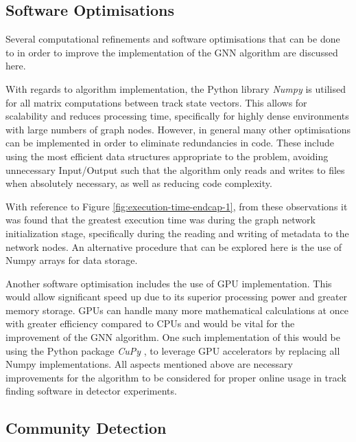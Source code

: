 \subsection{Software Optimisations}

Several computational refinements and software optimisations that can be done to in order to improve the implementation of the GNN algorithm are discussed here.

With regards to algorithm implementation, the Python library \textit{Numpy} \cite{harris2020array} is utilised for all matrix computations between track state vectors. This allows for scalability and reduces processing time, specifically for highly dense environments with large numbers of graph nodes. However, in general many other optimisations can be implemented in order to eliminate redundancies in code. These include using the most efficient data structures appropriate to the problem, avoiding unnecessary Input/Output such that the algorithm only reads and writes to files when absolutely necessary, as well as reducing code complexity.

With reference to Figure \ref{fig:execution-time-endcap-1}, from these observations it was found that the greatest execution time was during the graph network initialization stage, specifically during the reading and writing of metadata to the network nodes. An alternative procedure that can be explored here is the use of Numpy arrays for data storage.

Another software optimisation includes the use of GPU implementation. This would allow significant speed up due to its superior processing power and greater memory storage. GPUs can handle many more mathematical calculations at once with greater efficiency compared to CPUs and would be vital for the improvement of the GNN algorithm. One such implementation of this would be using the Python package \textit{CuPy} \cite{cupy_learningsys2017}, to leverage GPU accelerators by replacing all Numpy implementations. All aspects mentioned above are necessary improvements for the algorithm to be considered for proper online usage in track finding software in detector experiments.







\subsection{Community Detection}

